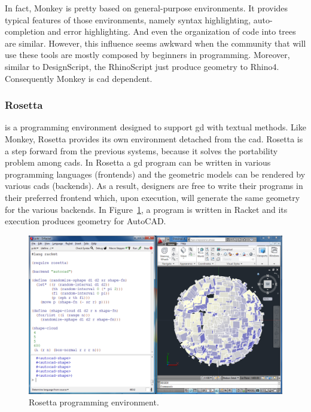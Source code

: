 In fact, Monkey is pretty based on general-purpose environments. It provides typical features of those environments, namely syntax highlighting, auto-completion and error highlighting. And even the organization of code into trees are similar. However, this influence seems awkward when the community that will use these tools are mostly composed by beginners in programming. Moreover, similar to DesignScript, the RhinoScript just produce geometry to Rhino4. Consequently Monkey is \ac{cad} dependent. 
\subsubsection{Rosetta~\cite{lopes2011portable}} is a programming environment designed to support \ac{gd} with textual methods. Like Monkey, Rosetta provides its own environment detached from the \ac{cad}. Rosetta is a step forward from the previous systems, because it solves the portability problem among \ac{cad}s. In Rosetta a \ac{gd} program can be written in various programming languages (frontends) and the geometric models can be rendered by various \ac{cad}s (backends). As a result, designers are free to write their programs in their preferred frontend which, upon execution, will generate the same geometry for the various backends. In Figure~\ref{fig:rosetta}, a program is written in Racket and its execution produces geometry for AutoCAD.

\begin{figure}[!htbp]
  \centering
  \includegraphics[width=1.0\textwidth]{img/rosetta1}
    \caption{Rosetta programming environment.}  
  \label{fig:rosetta}
\end{figure} 

